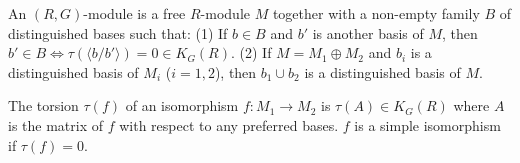 An $(R, G)$-module is a free $R$-module $M$ together with a non-empty family $B$ of distinguished bases such that:
(1) If $b \in B$ and $b'$ is another basis of $M$, then $b' \in B \Leftrightarrow \tau(\langle b/b' \rangle) = 0 \in K_G(R)$.
(2) If $M = M_1 \oplus M_2$ and $b_i$ is a distinguished basis of $M_i$ ($i = 1, 2$), then $b_1 \cup b_2$ is a distinguished basis of $M$.

The torsion $\tau(f)$ of an isomorphism $f: M_1 \rightarrow M_2$ is $\tau(A) \in K_G(R)$ where $A$ is the matrix of $f$ with respect to any preferred bases. $f$ is a simple isomorphism if $\tau(f) = 0$.
